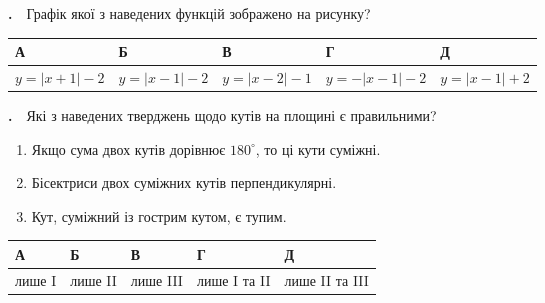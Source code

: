 \documentclass[12pt]{article}
\newenvironment{nmtfit}{\begin{lrbox}{\nmtfitbox}}{\end{lrbox}%
  \ifdim\wd\nmtfitbox>\linewidth \resizebox{\linewidth}{!}{\usebox{\nmtfitbox}}\else\usebox{\nmtfitbox}\fi}
\renewcommand{\headrulewidth}{0.4pt}
\renewcommand{\footrulewidth}{0.4pt}
\newlength{\nmtcellw}
\newcommand{\nmtSetCell}{\setlength{\nmtcellw}{\dimexpr(\linewidth-10\tabcolsep-6\arrayrulewidth)/5\relax}}
\newcommand{\answerTable}[5]{%
\par\nopagebreak\vspace{0.15cm}
\noindent\nmtSetCell
\begin{tabular}{|*{5}{>{\centering\arraybackslash}m{\nmtcellw}|}}
\hline
\rule[-0.15cm]{0pt}{0.6cm}\textbf{А} & \rule[-0.15cm]{0pt}{0.6cm}\textbf{Б} & \rule[-0.15cm]{0pt}{0.6cm}\textbf{В} & \rule[-0.15cm]{0pt}{0.6cm}\textbf{Г} & \rule[-0.15cm]{0pt}{0.6cm}\textbf{Д} \\
\hline
\rule[-0.2cm]{0pt}{0.75cm}#1 & \rule[-0.2cm]{0pt}{0.75cm}#2 & \rule[-0.2cm]{0pt}{0.75cm}#3 & \rule[-0.2cm]{0pt}{0.75cm}#4 & \rule[-0.2cm]{0pt}{0.75cm}#5 \\
\hline
\end{tabular}
\par\vspace{0.25cm}
}
\newcounter{zad}
\newcommand{\zadtask}[1]{\stepcounter{zad}\noindent\textbf{\thezad.}\ \ #1\par\nopagebreak\vspace{0.2cm}}
\newcommand{\zadnum}{\stepcounter{zad}\textbf{\thezad.}\ \ }
\newcounter{ans}
\newcommand{\nbvspace}[1]{\nopagebreak\vspace{#1}}
\begin{document}
\begin{samepage}
\noindent
\begin{minipage}[c]{0.58\textwidth}
\zadnum Графік якої з наведених функцій зображено на рисунку?
\end{minipage}
\hfill
\begin{minipage}[c]{0.40\textwidth}
\centering
\begin{nmtfit}\end{nmtfit}
\end{minipage}
\par\nbvspace{0.2cm}
\answerTable{$y = |x + 1| - 2$}{$y = |x - 1| - 2$}{$y = |x - 2| - 1$}{$y = -|x - 1| - 2$}{$y = |x - 1| + 2$}
\par{}
\end{samepage}

\begin{samepage}
\zadtask{Які з наведених тверджень щодо кутів на площині є правильними?\par
\nopagebreak\nbvspace{0.1cm}
\begin{enumerate}[label=\textbf{\Roman*.}, align=left, leftmargin=2.6em, labelsep=0.5em, itemsep=2pt, topsep=2pt]
\item Якщо сума двох кутів дорівнює $180^\circ$, то ці кути суміжні.
\item Бісектриси двох суміжних кутів перпендикулярні.
\item Кут, суміжний із гострим кутом, є тупим.
\end{enumerate}
\nopagebreak\nbvspace{0.1cm}}
\answerTable{лише I}{лише II}{лише III}{лише I та II}{лише II та III}
\par{}
\end{samepage}

\begingroup
\renewcommand{\headrulewidth}{0.4pt}
\renewcommand{\footrulewidth}{0.4pt}
\end{document}
